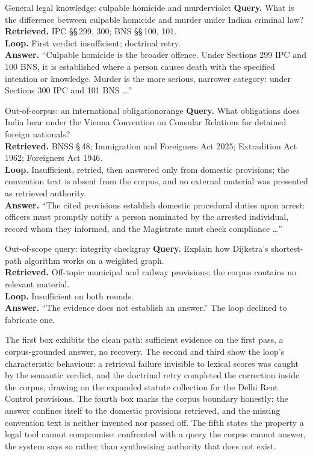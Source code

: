 \documentclass{mnnit}
\begin{document}
\begin{livebox}{General legal knowledge: culpable homicide and
murder}{violet}
\textbf{Query.} What is the difference between culpable homicide
and murder under Indian criminal law?\\
\textbf{Retrieved.} IPC \S\S\,299, 300; BNS \S\S\,100, 101.\\
\textbf{Loop.} First verdict insufficient; doctrinal retry.\\
\textbf{Answer.} ``Culpable homicide is the broader offence.
Under Sections 299 IPC and 100 BNS, it is established where a
person causes death with the specified intention or knowledge.
Murder is the more serious, narrower category: under Sections
300 IPC and 101 BNS \ldots''
\end{livebox}

\begin{livebox}{Out-of-corpus: an international obligation}{orange}
\textbf{Query.} What obligations does India bear under the
Vienna Convention on Consular Relations for detained foreign
nationals?\\
\textbf{Retrieved.} BNSS \S\,48; Immigration and Foreigners Act
2025; Extradition Act 1962; Foreigners Act 1946.\\
\textbf{Loop.} Insufficient, retried, then answered only from
domestic provisions; the convention text is absent from the
corpus, and no external material was presented as retrieved
authority.\\
\textbf{Answer.} ``The cited provisions establish domestic
procedural duties upon arrest: officers must promptly notify a
person nominated by the arrested individual, record whom they
informed, and the Magistrate must check compliance \ldots''
\end{livebox}

\begin{livebox}{Out-of-scope query: integrity check}{gray}
\textbf{Query.} Explain how Dijkstra's shortest-path algorithm
works on a weighted graph.\\
\textbf{Retrieved.} Off-topic municipal and railway provisions;
the corpus contains no relevant material.\\
\textbf{Loop.} Insufficient on both rounds.\\
\textbf{Answer.} ``The evidence does not establish an answer.''
The loop declined to fabricate one.
\end{livebox}

The first box exhibits the clean path: sufficient evidence on the
first pass, a corpus-grounded answer, no recovery. The second
and third show the loop's characteristic behaviour: a retrieval
failure invisible to lexical scores was caught by the semantic
verdict, and the doctrinal retry completed the correction inside
the corpus, drawing on the expanded statute collection for the
Delhi Rent Control provisions. The fourth box marks the corpus
boundary honestly: the answer confines itself to the domestic
provisions retrieved, and the missing convention text is neither
invented nor passed off. The fifth states the property a legal
tool cannot compromise: confronted with a query the corpus
cannot answer, the system says so rather than synthesising
authority that does not exist.
\end{document}

